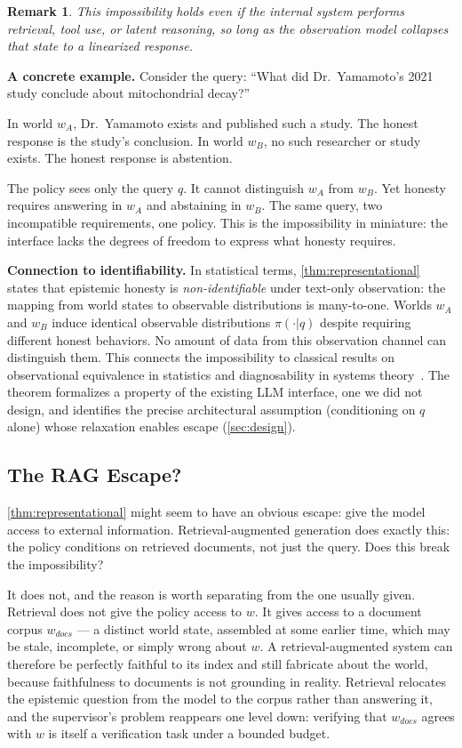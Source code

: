 \documentclass[11pt]{article}
\newcommand{\fakepara}[1]{\noindent\textbf{#1}\xspace}
\newtheorem{remark}{Remark}
\begin{document}
\begin{remark}
This impossibility holds even if the internal system performs retrieval, tool
use, or latent reasoning, so long as the observation model collapses that state
to a linearized response.
\end{remark}

\fakepara{A concrete example.}
Consider the query: ``What did Dr.\ Yamamoto's 2021 study conclude
about mitochondrial decay?''

In world $w_A$, Dr.\ Yamamoto exists and published such a study. The honest
response is the study's conclusion. In world $w_B$, no such researcher or study
exists. The honest response is abstention.

The policy sees only the query $q$. It cannot distinguish $w_A$ from $w_B$. Yet
honesty requires answering in $w_A$ and abstaining in $w_B$. The same query, two
incompatible requirements, one policy. This is the impossibility in miniature:
the interface lacks the degrees of freedom to express what honesty requires.

\fakepara{Connection to identifiability.}
In statistical terms, \autoref{thm:representational} states that epistemic
honesty is \emph{non-identifiable} under text-only observation: the mapping from
world states to observable distributions is many-to-one. Worlds $w_A$ and $w_B$
induce identical observable distributions $\pi(\cdot|q)$ despite requiring
different honest behaviors. No amount of data from this observation channel can
distinguish them. This connects the impossibility to classical results on
observational equivalence in statistics and diagnosability in systems
theory~\citep{sampath1995diagnosability}. The theorem formalizes a property of the
existing LLM interface, one we did not design, and identifies the precise
architectural assumption (conditioning on $q$ alone) whose relaxation enables
escape (\autoref{sec:design}).

\subsection{The RAG Escape?}\label{sec:rag}

\autoref{thm:representational} might seem to have an obvious escape: give
the model access to external information. Retrieval-augmented generation does
exactly this: the policy conditions on retrieved documents, not just the query.
Does this break the impossibility?

It does not, and the reason is worth separating from the one usually given.
Retrieval does not give the policy access to $w$. It gives access to a
document corpus $w_{docs}$ --- a distinct world state, assembled at some
earlier time, which may be stale, incomplete, or simply wrong about $w$. A
retrieval-augmented system can therefore be perfectly faithful to its index
and still fabricate about the world, because faithfulness to documents is not
grounding in reality. Retrieval relocates the epistemic question from the
model to the corpus rather than answering it, and the supervisor's problem
reappears one level down: verifying that $w_{docs}$ agrees with $w$ is itself
a verification task under a bounded budget.
\end{document}

